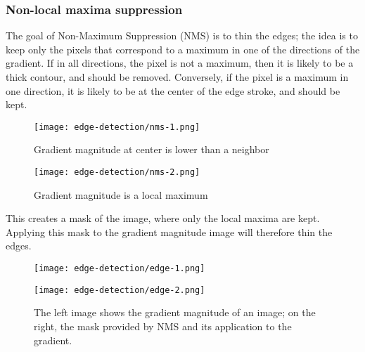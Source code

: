 \subsubsection{Non-local maxima suppression}
The goal of Non-Maximum Suppression (NMS) is to thin the edges; the idea is to keep only the pixels that correspond to a maximum in one of the directions of the gradient. If in all directions, the pixel is not a maximum, then it is likely to be a thick contour, and should be removed. Conversely, if the pixel is a maximum in one direction, it is likely to be at the center of the edge stroke, and should be kept.
\begin{figure}[H]
    \centering
    \begin{minipage}{.4\textwidth}
        \centering
        \texttt{[image: edge-detection/nms-1.png]}
        \caption*{Gradient magnitude at center is lower than a neighbor}
    \end{minipage}
    \begin{minipage}{.4\textwidth}
        \centering
        \texttt{[image: edge-detection/nms-2.png]}
        \caption*{Gradient magnitude is a local maximum}
    \end{minipage}
\end{figure}
This creates a mask of the image, where only the local maxima are kept. Applying this mask to the gradient magnitude image will therefore thin the edges.
\begin{figure}[H]
    \centering
    \begin{minipage}{.3\textwidth}
        \centering
        \texttt{[image: edge-detection/edge-1.png]}
    \end{minipage}
    \begin{minipage}{.3\textwidth}
        \centering
        \texttt{[image: edge-detection/edge-2.png]}
    \end{minipage}
    \caption{The left image shows the gradient magnitude of an image; on the right, the mask provided by NMS and its application to the gradient.}
\end{figure}

